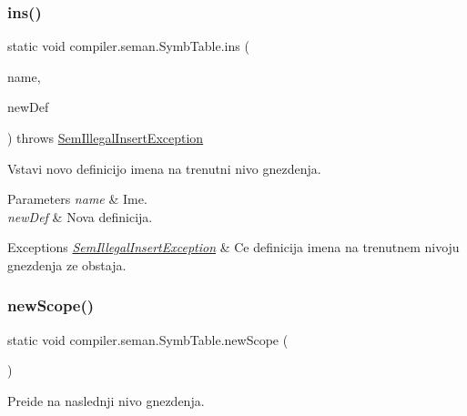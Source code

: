 \subsubsection{\texorpdfstring{ins()}{ins()}}
{\footnotesize\ttfamily static void compiler.\+seman.\+Symb\+Table.\+ins (\begin{DoxyParamCaption}\item[{String}]{name,  }\item[{\hyperlink{classcompiler_1_1abstr_1_1tree_1_1def_1_1_abs_def}{Abs\+Def}}]{new\+Def }\end{DoxyParamCaption}) throws \hyperlink{classcompiler_1_1seman_1_1_sem_illegal_insert_exception}{Sem\+Illegal\+Insert\+Exception}\hspace{0.3cm}{\ttfamily [static]}}

Vstavi novo definicijo imena na trenutni nivo gnezdenja.


\begin{DoxyParams}{Parameters}
{\em name} & Ime. \\
\hline
{\em new\+Def} & Nova definicija. \\
\hline
\end{DoxyParams}

\begin{DoxyExceptions}{Exceptions}
{\em \hyperlink{classcompiler_1_1seman_1_1_sem_illegal_insert_exception}{Sem\+Illegal\+Insert\+Exception}} & Ce definicija imena na trenutnem nivoju gnezdenja ze obstaja. \\
\hline
\end{DoxyExceptions}
\mbox{\label{classcompiler_1_1seman_1_1_symb_table_a720c5ab590fda1ce72c663bbd93a5c59}} 
\subsubsection{\texorpdfstring{new\+Scope()}{newScope()}}
{\footnotesize\ttfamily static void compiler.\+seman.\+Symb\+Table.\+new\+Scope (\begin{DoxyParamCaption}{ }\end{DoxyParamCaption})\hspace{0.3cm}{\ttfamily [static]}}

Preide na naslednji nivo gnezdenja. \mbox{\label{classcompiler_1_1seman_1_1_symb_table_aec82249448465a18d52d2c0371a3bc72}} 

